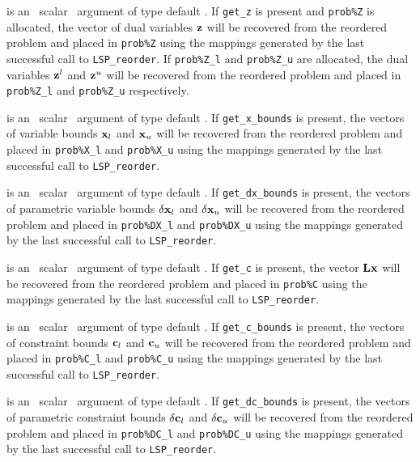 \documentclass{galahad}
\newcommand{\packagename}{LSP}
\begin{document}
\begin{description}
is an \optional\ scalar \intentin\ argument of type default \logical. 
If {\tt get\_z} is present and {\tt prob\%Z} is allocated, 
the vector of dual variables ${\mathbf{z}}$
will be recovered from  the reordered problem and placed in {\tt prob\%Z} 
using the mappings generated by the last successful call to 
{\tt \packagename\_reorder}. If {\tt prob\%Z\_l} and {\tt prob\%Z\_u} 
are allocated, the dual variables
${\mathbf{z}}^l$ and ${\mathbf{z}}^u$ will be recovered from  the reordered problem and 
placed in {\tt prob\%Z\_l} and {\tt prob\%Z\_u} respectively.
 
is an \optional\ scalar \intentin\ argument of type default \logical. 
If {\tt get\_x\_bounds} is present, 
the vectors of variable bounds ${\mathbf{x}}_l$ and ${\mathbf{x}}_u$
will be recovered from  the reordered problem and placed in {\tt prob\%X\_l} 
and {\tt prob\%X\_u} using the mappings generated by the last successful 
call to {\tt \packagename\_reorder}. 
 
is an \optional\ scalar \intentin\ argument of type default \logical. 
If {\tt get\_dx\_bounds} is present, 
the vectors of parametric variable bounds $\delta {\mathbf{x}}_l$ and 
$\delta {\mathbf{x}}_u$
will be recovered from  the reordered problem and placed in {\tt prob\%DX\_l} 
and {\tt prob\%DX\_u} using the mappings generated by the last successful 
call to {\tt \packagename\_reorder}. 

is an \optional\ scalar \intentin\ argument of type default \logical. 
If {\tt get\_c} is present, the vector ${\mathbf{L}} {\mathbf{x}}$ 
will be recovered from  the reordered problem and placed in {\tt prob\%C} 
using the mappings generated by the last successful call to 
{\tt \packagename\_reorder}. 
 
is an \optional\ scalar \intentin\ argument of type default \logical. 
If {\tt get\_c\_bounds} is present, 
the vectors of constraint bounds ${\mathbf{c}}_l$ and 
${\mathbf{c}}_u$
will be recovered from  the reordered problem and placed in {\tt prob\%C\_l} 
and {\tt prob\%C\_u} using the mappings generated by the last successful 
call to {\tt \packagename\_reorder}. 
 
is an \optional\ scalar \intentin\ argument of type default \logical. 
If {\tt get\_dc\_bounds} is present, 
the vectors of parametric constraint bounds $\delta {\mathbf{c}}_l$ and $\delta {\mathbf{c}}_u$
will be recovered from  the reordered problem and placed in {\tt prob\%DC\_l} 
and {\tt prob\%DC\_u} using the mappings generated by the last successful 
call to {\tt \packagename\_reorder}. 
 

\end{description}
\end{document}
